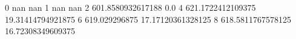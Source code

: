 0 nan nan
1 nan nan
2 601.8580932617188 0.0
4 621.1722412109375 19.31414794921875
6 619.029296875 17.17120361328125
8 618.5811767578125 16.72308349609375
